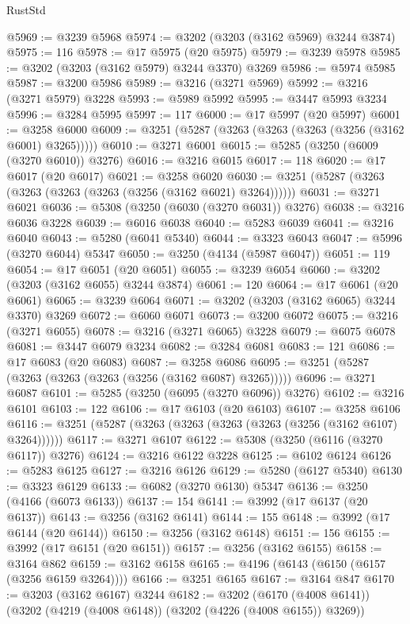 \begin{lexlean}{RustStd}
\begin{coremodule}
@5969 := @3239 @5968
@5974 := @3202 (@3203 (@3162 @5969) @3244 @3874)
@5975 := 116
@5978 := @17 @5975 (@20 @5975)
@5979 := @3239 @5978
@5985 := @3202 (@3203 (@3162 @5979) @3244 @3370) @3269
@5986 := @5974 @5985
@5987 := @3200 @5986
@5989 := @3216 (@3271 @5969)
@5992 := @3216 (@3271 @5979) @3228
@5993 := @5989 @5992
@5995 := @3447 @5993 @3234
@5996 := @3284 @5995
@5997 := 117
@6000 := @17 @5997 (@20 @5997)
@6001 := @3258 @6000
@6009 := @3251 (@5287 (@3263 (@3263 (@3263 (@3256 (@3162 @6001) @3265)))))
@6010 := @3271 @6001
@6015 := @5285 (@3250 (@6009 (@3270 @6010)) @3276)
@6016 := @3216 @6015
@6017 := 118
@6020 := @17 @6017 (@20 @6017)
@6021 := @3258 @6020
@6030 := @3251 (@5287 (@3263 (@3263 (@3263 (@3263 (@3256 (@3162 @6021) @3264))))))
@6031 := @3271 @6021
@6036 := @5308 (@3250 (@6030 (@3270 @6031)) @3276)
@6038 := @3216 @6036 @3228
@6039 := @6016 @6038
@6040 := @5283 @6039
@6041 := @3216 @6040
@6043 := @5280 (@6041 @5340)
@6044 := @3323 @6043
@6047 := @5996 (@3270 @6044) @5347
@6050 := @3250 (@4134 (@5987 @6047))
@6051 := 119
@6054 := @17 @6051 (@20 @6051)
@6055 := @3239 @6054
@6060 := @3202 (@3203 (@3162 @6055) @3244 @3874)
@6061 := 120
@6064 := @17 @6061 (@20 @6061)
@6065 := @3239 @6064
@6071 := @3202 (@3203 (@3162 @6065) @3244 @3370) @3269
@6072 := @6060 @6071
@6073 := @3200 @6072
@6075 := @3216 (@3271 @6055)
@6078 := @3216 (@3271 @6065) @3228
@6079 := @6075 @6078
@6081 := @3447 @6079 @3234
@6082 := @3284 @6081
@6083 := 121
@6086 := @17 @6083 (@20 @6083)
@6087 := @3258 @6086
@6095 := @3251 (@5287 (@3263 (@3263 (@3263 (@3256 (@3162 @6087) @3265)))))
@6096 := @3271 @6087
@6101 := @5285 (@3250 (@6095 (@3270 @6096)) @3276)
@6102 := @3216 @6101
@6103 := 122
@6106 := @17 @6103 (@20 @6103)
@6107 := @3258 @6106
@6116 := @3251 (@5287 (@3263 (@3263 (@3263 (@3263 (@3256 (@3162 @6107) @3264))))))
@6117 := @3271 @6107
@6122 := @5308 (@3250 (@6116 (@3270 @6117)) @3276)
@6124 := @3216 @6122 @3228
@6125 := @6102 @6124
@6126 := @5283 @6125
@6127 := @3216 @6126
@6129 := @5280 (@6127 @5340)
@6130 := @3323 @6129
@6133 := @6082 (@3270 @6130) @5347
@6136 := @3250 (@4166 (@6073 @6133))
@6137 := 154
@6141 := @3992 (@17 @6137 (@20 @6137))
@6143 := @3256 (@3162 @6141)
@6144 := 155
@6148 := @3992 (@17 @6144 (@20 @6144))
@6150 := @3256 (@3162 @6148)
@6151 := 156
@6155 := @3992 (@17 @6151 (@20 @6151))
@6157 := @3256 (@3162 @6155)
@6158 := @3164 @862
@6159 := @3162 @6158
@6165 := @4196 (@6143 (@6150 (@6157 (@3256 @6159 @3264))))
@6166 := @3251 @6165
@6167 := @3164 @847
@6170 := @3203 (@3162 @6167) @3244
@6182 := @3202
    (@6170 (@4008 @6141))
    (@3202 (@4219 (@4008 @6148)) (@3202 (@4226 (@4008 @6155)) @3269))

\end{coremodule}
\end{lexlean}
